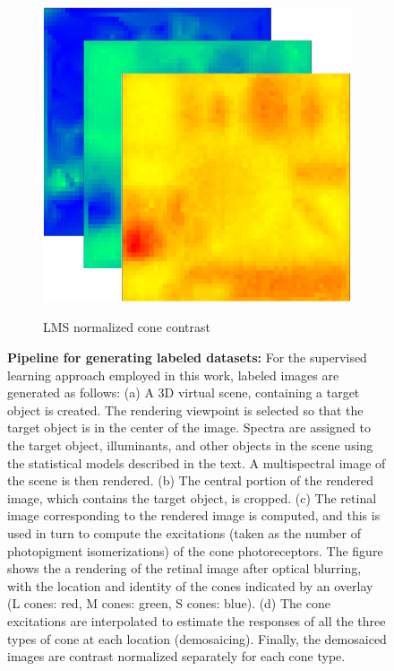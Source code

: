 \documentclass{jov}
\begin{document}
\begin{figure}
\begin{subfigure}[b]{0.19 \textwidth}
        \label{fig:croppedImageWithMosaic}
    \end{subfigure}
    ~
    \begin{subfigure}[b]{0.2 \textwidth}
        \caption{LMS normalized cone contrast}
        \includegraphics[width=\textwidth]{../FiguresDraft4/Figure9/Figure9_d.png}
        \label{fig:coneContrast}
    \end{subfigure}
    \label{fig:sceneWithCroppedImage}
    \caption{{\bf Pipeline for generating labeled datasets:}  For the supervised learning approach employed in this work, labeled images are generated as follows: (a) A 3D virtual scene, containing a target object is created. The rendering viewpoint is selected so that the target object is in the center of the image. Spectra are assigned to the target object, illuminants, and other objects in the scene using the statistical models described in the text. A multispectral image of the scene is then rendered. (b) The central portion of the rendered image, which contains the target object, is cropped. (c) The retinal image corresponding to the rendered image is computed, and this is used in turn to compute the excitations (taken as the number of photopigment isomerizations) of the cone photoreceptors. The figure shows the a rendering of the retinal image after optical blurring, with the location and identity of the cones indicated by an overlay (L cones: red, M cones: green, S cones: blue).  (d) The cone excitations are interpolated to estimate the responses of all the three types of cone at each location (demosaicing). Finally, the demosaiced images are contrast normalized separately for each cone type.}
\end{figure}
\end{document}
